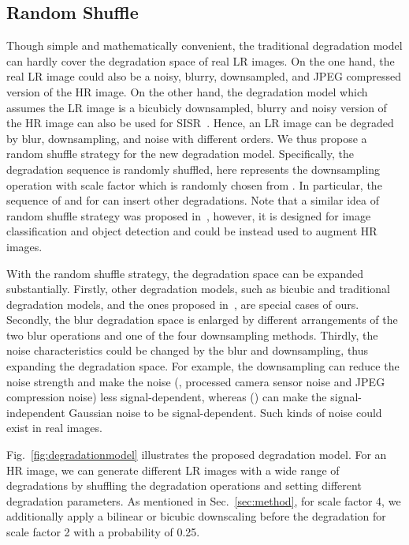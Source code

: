 \documentclass[10pt,twocolumn,letterpaper]{article}
\begin{document}
\subsection{Random Shuffle}
\label{ssc:random_shuffle}
Though simple and mathematically convenient, the traditional degradation model can hardly cover the degradation space of real LR images. On the one hand, the real LR image could also be a noisy, blurry, downsampled, and JPEG compressed version of the HR image. On the other hand, the degradation model which assumes the LR image is a bicubicly downsampled, blurry and noisy version of the HR image can also be used for SISR~\cite{gu2019blind,zhang2019deep}.
Hence, an LR image can be degraded by blur, downsampling, and noise with different orders. We thus propose a random shuffle strategy for the new degradation model. Specifically, the degradation sequence
 is randomly shuffled, here  represents the downsampling operation with scale factor  which is randomly chosen from . In particular, the sequence of  and  for  can insert other degradations.
Note that a similar idea of random shuffle strategy was proposed in~\cite{cubuk2020randaugment}, however, it is designed for image classification and object detection and could be instead used to augment HR images.



With the random shuffle strategy, the degradation space can be expanded substantially.
Firstly, other degradation models, such as bicubic and traditional degradation models, and the ones proposed in~\cite{gu2019blind,zhang2019deep}, are special cases of ours. Secondly, the blur degradation space is enlarged by different arrangements of the two blur operations and one of the four downsampling methods.
Thirdly, the noise characteristics could be changed by the blur and downsampling, thus expanding the degradation space. For example, the downsampling can reduce the noise strength and make the noise (\eg, processed camera sensor noise and JPEG compression noise) less signal-dependent, whereas  () can make the signal-independent Gaussian noise to be signal-dependent. Such kinds of noise could exist in real images.


Fig.~\ref{fig:degradationmodel} illustrates the proposed degradation model. For an HR image, we can generate different LR images with a wide range of degradations by shuffling the degradation operations and setting different degradation parameters. As mentioned in Sec.~\ref{sec:method}, for scale factor 4, we additionally apply a bilinear or bicubic downscaling before the degradation for scale factor 2 with a probability of 0.25.
\end{document}
